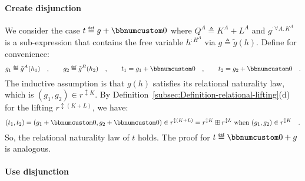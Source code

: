 \paragraph{Create disjunction}

We consider the case $t\triangleq g+\bbnum 0$ where $Q^{A}\triangleq K^{A}+L^{A}$
and $g^{:\forall A.\,K^{A}}$ is a sub-expression that contains the
free variable $h^{:H^{A}}$ via $g\triangleq\tilde{g}(h)$. Define
for convenience: 
\[
g_{1}\triangleq\tilde{g}^{A}(h_{1})\quad,\quad\quad g_{2}\triangleq\tilde{g}^{B}(h_{2})\quad,\quad\quad t_{1}=g_{1}+\bbnum 0\quad,\quad\quad t_{2}=g_{2}+\bbnum 0\quad.
\]
The inductive assumption is that $g(h)$ satisfies its relational
naturality law, which is $(g_{1},g_{2})\in r^{\updownarrow K}$. By
Definition~\ref{subsec:Definition-relational-lifting}(d) for the
lifting $r^{\updownarrow(K+L)}$, we have:
\[
(t_{1},t_{2})=(g_{1}+\bbnum 0,g_{2}+\bbnum 0)\in r^{\updownarrow(K+L)}=r^{\updownarrow K}\boxplus r^{\updownarrow L}\text{ when }(g_{1},g_{2})\in r^{\updownarrow K}\quad.
\]
So, the relational naturality law of $t$ holds. The proof for $t\triangleq\bbnum 0+g$
is analogous.

\paragraph{Use disjunction}


